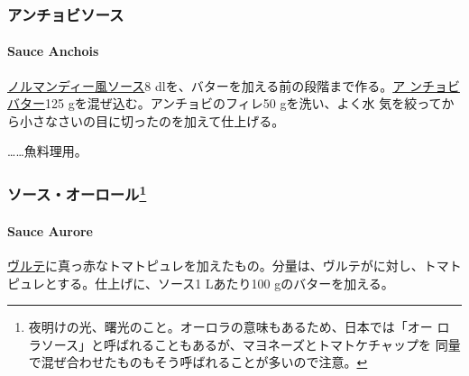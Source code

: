 \begin{recette}
\maeaki

\hypertarget{ux30a2ux30f3ux30c1ux30e7ux30d3ux30bdux30fcux30b9}{%
\subsubsection{アンチョビソース}\label{ux30a2ux30f3ux30c1ux30e7ux30d3ux30bdux30fcux30b9}}

\hypertarget{sauce-anchois}{%
\paragraph{Sauce Anchois}\label{sauce-anchois}}


\href{}{ノルマンディー風ソース}8
dlを、バターを加える前の段階まで作る。\href{}{ア ンチョビバター}125
gを混ぜ込む。アンチョビのフィレ50 gを洗い、よく水
気を絞ってから小さなさいの目に切ったのを加えて仕上げる。

\ldots{}\ldots{}魚料理用。

\maeaki

\hypertarget{ux30bdux30fcux30b9ux30aaux30fcux30edux30fcux30eb4}{%
\subsubsection[ソース・オーロール]{\texorpdfstring{ソース・オーロール\footnote{夜明けの光、曙光のこと。オーロラの意味もあるため、日本では「オー
  ロラソース」と呼ばれることもあるが、マヨネーズとトマトケチャップを
  同量で混ぜ合わせたものもそう呼ばれることが多いので注意。}}{ソース・オーロール}}\label{ux30bdux30fcux30b9ux30aaux30fcux30edux30fcux30eb4}}

\hypertarget{sauce-aurore}{%
\paragraph{Sauce Aurore}\label{sauce-aurore}}


\protect\hyperlink{veloute}{ヴルテ}に真っ赤なトマトピュレを加えたもの。分量は、ヴルテが\troisquarts{}に対し、トマトピュレ\unquart{}とする。仕上げに、ソース1
Lあたり100 gのバターを加える。


\end{recette}
